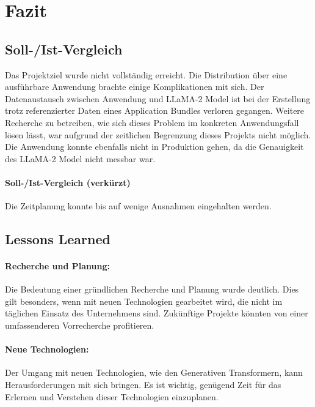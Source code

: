 \section{Fazit} 
\label{sec:Fazit}

\subsection{Soll-/Ist-Vergleich}
\label{sec:SollIstVergleich}
Das Projektziel wurde nicht vollständig erreicht. Die Distribution über eine 
ausführbare Anwendung brachte einige Komplikationen mit sich. Der Datenaustausch 
zwischen Anwendung und \ac{LLaMA}-2 Model ist bei der Erstellung trotz referenzierter
Daten eines Application Bundles verloren gegangen. Weitere Recherche zu betreiben, 
wie sich dieses Problem im konkreten Anwendungsfall lösen lässt, war aufgrund der 
zeitlichen Begrenzung dieses Projekts nicht möglich. Die Anwendung konnte ebenfalls 
nicht in Produktion gehen, da die Genauigkeit des \ac{LLaMA}-2 Model nicht messbar war. 



\paragraph{Soll-/Ist-Vergleich (verkürzt)}
Die Zeitplanung konnte bis auf wenige Ausnahmen eingehalten werden.

\subsection{Lessons Learned}
\label{sec:LessonsLearned}

\paragraph{Recherche und Planung:}
Die Bedeutung einer gründlichen Recherche und Planung wurde deutlich. 
Dies gilt besonders, wenn mit neuen Technologien gearbeitet wird, 
die nicht im täglichen Einsatz des Unternehmens sind. 
Zukünftige Projekte könnten von einer umfassenderen Vorrecherche profitieren.

\paragraph{Neue Technologien:} 
Der Umgang mit neuen Technologien, wie den Generativen Transformern, 
kann Herausforderungen mit sich bringen. Es ist wichtig, 
genügend Zeit für das Erlernen und Verstehen dieser Technologien einzuplanen.

